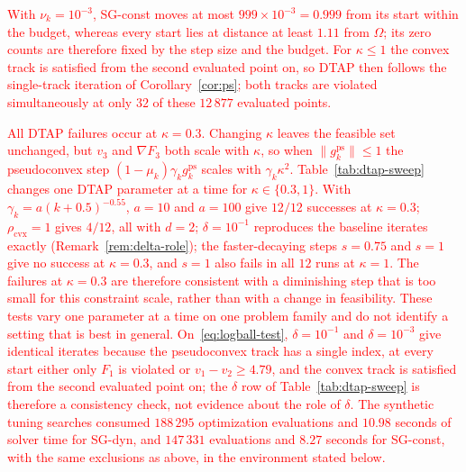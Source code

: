 \documentclass[]{interact}
\theoremstyle{plain}
\theoremstyle{definition}
\theoremstyle{remark}
\newcommand{\cvx}{\mathrm{cvx}}
\newcommand{\ps}{\mathrm{ps}}
\begin{document}
\leavevmode\textcolor{red}{With $\nu_k=10^{-3}$, SG-const moves at most $999\times10^{-3}=0.999$ from its start
within the budget, whereas every start lies at distance at least $1.11$ from
$\Omega$; its zero counts are therefore fixed by the step size and the budget.
For $\kappa\le1$ the convex track is satisfied from the second evaluated point on,
so DTAP then follows the single-track iteration of Corollary~\ref{cor:ps}; both tracks are
violated simultaneously at only $32$ of these $12\,877$ evaluated points.}

\leavevmode\textcolor{red}{All DTAP failures occur at $\kappa=0.3$. Changing $\kappa$ leaves the feasible set
unchanged, but $v_3$ and $\nabla F_3$ both scale with $\kappa$, so when
$\|g^{\ps}_k\|\le1$ the pseudoconvex step $(1-\mu_k)\gamma_k g^{\ps}_k$ scales with
$\gamma_k\kappa^2$. Table~\ref{tab:dtap-sweep} changes one DTAP parameter at a time
for $\kappa\in\{0.3,1\}$. With $\gamma_k=a(k+0.5)^{-0.55}$, $a=10$ and $a=100$ give
$12/12$ successes at $\kappa=0.3$; $\rho_{\cvx}=1$ gives $4/12$, all with $d=2$;
$\delta=10^{-1}$ reproduces the baseline iterates exactly (Remark~\ref{rem:delta-role}); the
faster-decaying steps $s=0.75$ and $s=1$ give no success at $\kappa=0.3$, and
$s=1$ also fails in all $12$ runs at $\kappa=1$. The failures at $\kappa=0.3$ are
therefore consistent with a diminishing step that is too small for this
constraint scale, rather than with a change in feasibility. These tests vary
one parameter at a time on one problem family and do not identify a setting
that is best in general.
On~\eqref{eq:logball-test}, $\delta=10^{-1}$ and $\delta=10^{-3}$ give identical iterates because
the pseudoconvex track has a single index, at every start either only $F_1$ is violated or
$v_1-v_2\ge4.79$, and the convex track is satisfied from the second evaluated point on; the
$\delta$ row of Table~\ref{tab:dtap-sweep} is therefore a consistency check, not evidence about
the role of $\delta$.
The synthetic tuning searches consumed $188\,295$ optimization evaluations and
$10.98$ seconds of solver time for SG-dyn, and $147\,331$ evaluations and $8.27$
seconds for SG-const, with the same exclusions as above, in the environment
stated below.}
\end{document}
